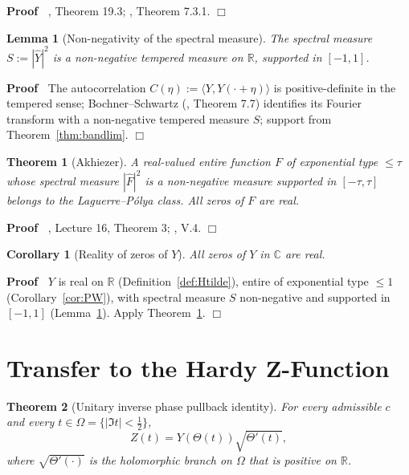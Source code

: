 \documentclass{article}
\newcommand{\assign}{:=}
\newcommand{\cdummy}{\cdot}
\newenvironment{proof}{\noindent\textbf{Proof\ }}{\hspace*{\fill}$\Box$\medskip}
\newtheorem{corollary}{Corollary}
\newtheorem{lemma}{Lemma}
\newtheorem{theorem}{Theorem}
\begin{document}
\begin{proof}
  {\cite{Rudin}}, Theorem 19.3; {\cite{Hormander}}, Theorem 7.3.1.
\end{proof}

\begin{lemma}
  [Non-negativity of the spectral measure]\label{lem:PSD} The spectral measure
  $S \assign | \hat{Y} |^2$ is a non-negative tempered measure on
  $\mathbb{R}$, supported in $[- 1, 1]$.
\end{lemma}

\begin{proof}
  The autocorrelation $C (\eta) \assign \langle Y, Y (\cdot + \eta) \rangle$
  is positive-definite in the tempered sense; Bochner--Schwartz
  ({\cite{Rudin-FA}}, Theorem 7.7) identifies its Fourier transform with a
  non-negative tempered measure $S$; support from Theorem~\ref{thm:bandlim}.
\end{proof}

\begin{theorem}
  [Akhiezer]\label{thm:akhiezer} A real-valued entire function $F$ of
  exponential type $\le \tau$ whose spectral measure $| \hat{F} |^2$ is a
  non-negative measure supported in $[- \tau, \tau]$ belongs to the
  Laguerre--P{\'o}lya class. All zeros of $F$ are real.
\end{theorem}

\begin{proof}
  {\cite{Levin}}, Lecture 16, Theorem 3; {\cite{Akhiezer}}, {\textsection}V.4.
\end{proof}

\begin{corollary}
  [Reality of zeros of $Y$]\label{cor:Hzero} All zeros of $Y$ in $\mathbb{C}$
  are real.
\end{corollary}

\begin{proof}
  $Y$ is real on $\mathbb{R}$ (Definition~\ref{def:Htilde}), entire of
  exponential type $\le 1$ (Corollary~\ref{cor:PW}), with spectral measure $S$
  non-negative and supported in $[- 1, 1]$ (Lemma~\ref{lem:PSD}). Apply
  Theorem~\ref{thm:akhiezer}.
\end{proof}

\section{Transfer to the Hardy Z-Function}

\begin{theorem}
  [Unitary inverse phase pullback identity]\label{thm:utc} For every
  admissible $c$ and every $t \in \Omega = \{| \Im t| < \tfrac{1}{2} \}$,
  \[ Z (t) = Y (\Theta (t)) \sqrt{\Theta' (t)}, \]
  where $\sqrt{\Theta' (\cdummy)}$ is the holomorphic branch on $\Omega$ that
  is positive on $\mathbb{R}$.
\end{theorem}
\end{document}
